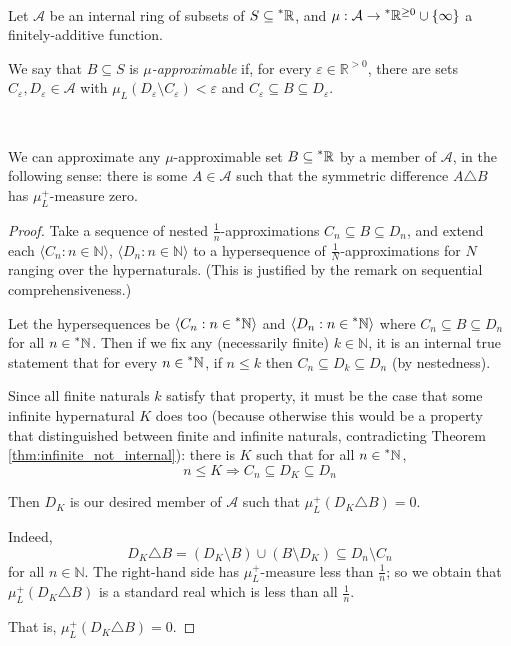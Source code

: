 \documentclass[11pt]{amsart}
\theoremstyle{remark}
\newcommand{\hyp}[1][\mathbb{R}]{\prescript{*}{}{#1}}
\newcommand{\symdiff}{\triangle}
\begin{document}
\

\begin{defn}[$\mu$-approximability] \label{defn:muapprox}
Let $\mathcal{A}$ be an internal ring of subsets of $S \subseteq \hyp$, and $\mu: \mathcal{A} \to \hyp^{\geq 0} \cup \{ \infty \}$ a finitely-additive function.

We say that $B \subseteq S$ is \emph{$\mu$-approximable} if, for every $\varepsilon \in \mathbb{R}^{>0}$, there are sets $C_{\varepsilon}, D_{\varepsilon} \in \mathcal{A}$ with $\mu_L(D_{\varepsilon} \setminus C_{\varepsilon}) < \varepsilon$ and $C_{\varepsilon} \subseteq B \subseteq D_{\varepsilon}$.
\end{defn}

\

\begin{lemma} \label{lemma:approx} We can approximate any $\mu$-approximable set $B \subseteq \hyp$ by a member of $\mathcal{A}$, in the following sense: there is some $A \in \mathcal{A}$ such that the symmetric difference $A \symdiff B$ has $\mu_L^+$-measure zero.
\end{lemma}
\begin{proof}
Take a sequence of nested $\frac{1}{n}$-approximations $C_{n} \subseteq B \subseteq D_n$, and extend each $\langle C_n : n \in \mathbb{N} \rangle$, $\langle D_n: n \in \mathbb{N} \rangle$ to a hypersequence of $\frac{1}{N}$-approximations for $N$ ranging over the hypernaturals.
(This is justified by the remark on sequential comprehensiveness.)

Let the hypersequences be $\langle C_n : n \in \hyp[\mathbb{N}] \rangle$ and $\langle D_n : n \in \hyp[\mathbb{N}] \rangle$ where $C_n \subseteq B \subseteq D_n$ for all $n \in \hyp[\mathbb{N}]$.
Then if we fix any (necessarily finite) $k \in \mathbb{N}$, it is an internal true statement that for every $n \in \hyp[\mathbb{N}]$, if $n \leq k$ then $C_n \subseteq D_k \subseteq D_n$ (by nestedness).

Since all finite naturals $k$ satisfy that property, it must be the case that some infinite hypernatural $K$ does too (because otherwise this would be a property that distinguished between finite and infinite naturals, contradicting Theorem \ref{thm:infinite_not_internal}): there is $K$ such that for all $n \in \hyp[\mathbb{N}]$, $$n \leq K \Rightarrow C_n \subseteq D_K \subseteq D_n$$

Then $D_K$ is our desired member of $\mathcal{A}$ such that $\mu_L^+(D_K \symdiff B) = 0$.

Indeed, $$D_K \symdiff B = (D_K \setminus B) \cup (B \setminus D_K) \subseteq D_n \setminus C_n$$ for all $n \in \mathbb{N}$.
The right-hand side has $\mu_L^+$-measure less than $\frac{1}{n}$; 
so we obtain that $\mu_L^+(D_K \symdiff B)$ is a standard real which is less than all $\frac{1}{n}$.

That is, $\mu_L^+(D_K \symdiff B) = 0$.
\end{proof}
\end{document}
